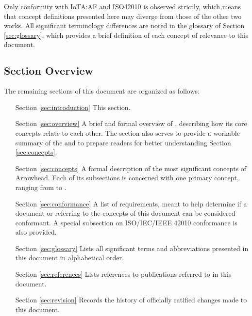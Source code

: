 Only conformity with IoTA:AF and ISO42010 is observed strictly, which means that concept definitions presented here may diverge from those of the other two works.
All significant terminology differences are noted in the glossary of Section \ref{sec:glossary}, which provides a brief definition of each concept of relevance to this document.

\subsection{Section Overview}
\label{sec:introduction:sections}

The remaining sections of this document are organized as follows:
\vspace*{2mm}
\begin{itemize}[leftmargin=2cm,rightmargin=0pt,labelwidth=2cm,labelsep=0pt,itemindent=0pt,parsep=0.1cm,topsep=0.1cm,align=left]

\item[Section \ref{sec:introduction}]
This section.

\item[Section \ref{sec:overview}]
A brief and formal overview of , describing how its core concepts relate to each other.
The section also serves to provide a workable summary of the  and to prepare readers for better understanding Section \ref{sec:concepts}.

\item[Section \ref{sec:concepts}]
A formal description of the most significant concepts of Arrowhead.
Each of its subsections is concerned with one primary concept, ranging from  to .

\item[Section \ref{sec:conformance}]
A list of requirements, meant to help determine if a document or  referring to the concepts of this document can be considered conformant.
A special subsection on ISO/IEC/IEEE 42010 conformance is also provided.

\item[Section \ref{sec:glossary}]
Lists all significant terms and abbreviations presented in this document in alphabetical order.

\item[Section \ref{sec:references}]
Lists references to publications referred to in this document.

\item[Section \ref{sec:revision}]
Records the history of officially ratified changes made to this document.

\end{itemize}
